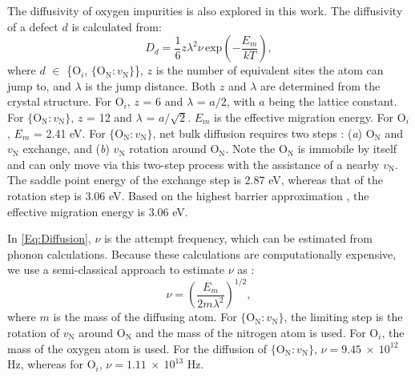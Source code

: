 \documentclass[preprint,12pt,sort&compress]{elsarticle}
\newcommand{\?}{\stackrel{?}{=}}
\begin{document}
The diffusivity of oxygen impurities is also explored in this work. The diffusivity of a defect $d$ is calculated from:
\begin{equation}
D_d = \frac{1}{6} z \lambda^2 \nu \, \text{exp}\! \left( - \frac{E_m}{ k T } \right),
\label{Eq:Diffusion}
\end{equation}
\noindent where $d$ $\in$ \{O$_i$, $\{\text{O}_\text{N} \! : \! v_\text{N}\}$\}, $z$ is the number of equivalent sites the atom can jump to, and $\lambda$ is the jump distance. Both $z$ and $\lambda$ are determined from the crystal structure. For O$_i$, $z$ = 6 and $\lambda$ = $a/2$, with $a$ being the lattice constant. For $\{\text{O}_\text{N} \! : \! v_\text{N}\}$, $z$ = 12 and $\lambda$ = $a/\sqrt{2}$. $E_m$ is the effective migration energy. For O$_i$, $E_m$ = 2.41 eV. For $\{\text{O}_\text{N} \! : \! v_\text{N}\}$, net bulk diffusion requires two steps \cite{Kocevski2022II}: (\textit{a}) O$_\text{N}$ and $v_\text{N}$ exchange, and (\textit{b}) $v_\text{N}$ rotation around O$_\text{N}$. Note the $\text{O}_\text{N}$ is immobile by itself and can only move via this two-step process with the assistance of a nearby $v_\text{N}$. The saddle point energy of the exchange step is 2.87 eV, whereas that of the rotation step is 3.06 eV. Based on the highest barrier approximation \cite{Claisse2016}, the effective migration energy is 3.06 eV. %

In \cref{Eq:Diffusion}, $\nu$ is the attempt frequency, which can be estimated from phonon calculations. Because these calculations are computationally expensive, we use a semi-classical approach to estimate $\nu$ as \cite{Olander2017}:
\begin{equation}
\nu = \left( \frac{E_m}{2m\lambda^2} \right)^{1/2},
\label{Eq:nu}
\end{equation}
where $m$ is the mass of the diffusing atom. For $\{\text{O}_\text{N} \! : \! v_\text{N}\}$, the limiting step is the rotation of $v_\text{N}$  around O$_\text{N}$ and the mass of the nitrogen atom is used. For O$_i$, the mass of the oxygen atom is used. For the diffusion of $\{\text{O}_\text{N} \! : \! v_\text{N}\}$, $\nu = 9.45~\times~10^{12}$ Hz, whereas for $\text{O}_i$, $\nu = 1.11~\times~10^{13}$ Hz.

\end{document}
